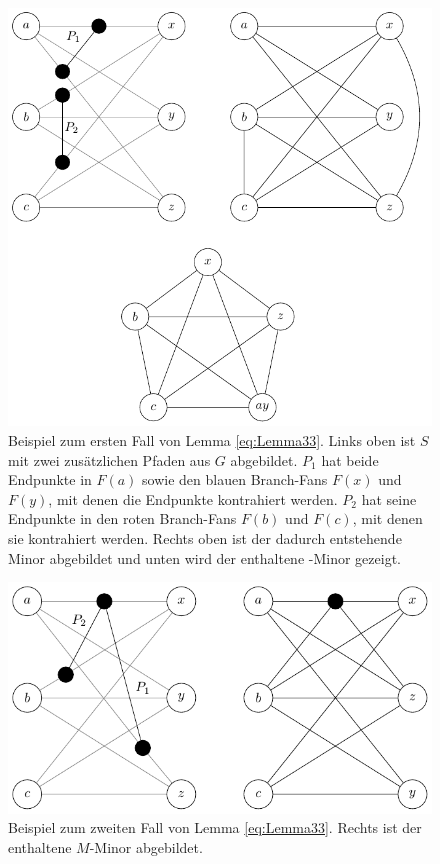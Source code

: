 \begin{figure}[H]
  \centering
  \includegraphics[keepaspectratio]{bilder/Lemma331.pdf}
  \caption{Beispiel zum ersten Fall von Lemma \ref{eq:Lemma33}.
           Links oben ist $S$ mit zwei zusätzlichen Pfaden aus $G$ abgebildet.
           $P_1$ hat beide Endpunkte in $F(a)$ sowie den blauen Branch-Fans $F(x)$ und $F(y)$, mit denen die Endpunkte kontrahiert werden.
           $P_2$ hat seine Endpunkte in den roten Branch-Fans $F(b)$ und $F(c)$, mit denen sie kontrahiert werden.
           Rechts oben ist der dadurch entstehende Minor abgebildet und unten wird der enthaltene \kf-Minor gezeigt.}
  \label{fig:Lemma331}
\end{figure}
\begin{figure}[H]
  \centering
  \includegraphics[keepaspectratio]{bilder/Lemma332.pdf}
  \caption{Beispiel zum zweiten Fall von Lemma \ref{eq:Lemma33}.
           Rechts ist der enthaltene $M$-Minor abgebildet.}
  \label{fig:Lemma332}
\end{figure}

